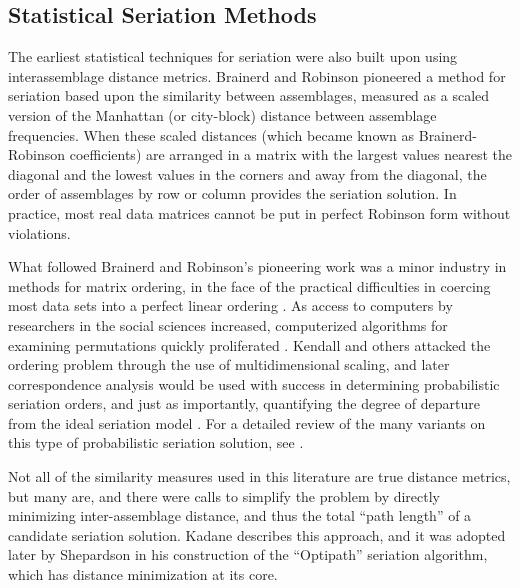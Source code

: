 \documentclass[graybox,natbib]{svmult}
\begin{document}
\subsection{Statistical Seriation
Methods}\label{statistical-seriation-methods}

The earliest statistical techniques for seriation were also built upon
using interassemblage distance metrics. Brainerd and Robinson
\citep{Brainerd1951, Robinson1951} pioneered a method for seriation
based upon the similarity between assemblages, measured as a scaled
version of the Manhattan (or city-block) distance between assemblage
frequencies. When these scaled distances (which became known as
Brainerd-Robinson coefficients) are arranged in a matrix with the
largest values nearest the diagonal and the lowest values in the corners
and away from the diagonal, the order of assemblages by row or column
provides the seriation solution. In practice, most real data matrices
cannot be put in perfect Robinson form without violations.

What followed Brainerd and Robinson's pioneering work was a minor
industry in methods for matrix ordering, in the face of the practical
difficulties in coercing most data sets into a perfect linear ordering
\citep[e.g.,][]{dempsey1963statistical, Kendall1963, Matthews1963, Bordaz1970aa, Gardin1970, Kendall1970, Kendall1971}.
As access to computers by researchers in the social sciences increased,
computerized algorithms for examining permutations quickly proliferated
\citep{Ascher1963, craytor1968refinements, Kuzara1966}. Kendall
\citeyearpar{Kendall1969} and others attacked the ordering problem
through the use of multidimensional scaling, and later correspondence
analysis would be used with success in determining probabilistic
seriation orders, and just as importantly, quantifying the degree of
departure from the ideal seriation model \citep{Smith2005}. For a
detailed review of the many variants on this type of probabilistic
seriation solution, see \citep{Marquardt:1978aa}.

Not all of the similarity measures used in this literature are true
distance metrics, but many are, and there were calls to simplify the
problem by directly minimizing inter-assemblage distance, and thus the
total ``path length'' of a candidate seriation solution. Kadane
\citeyearpar{Kadane1971} describes this approach, and it was adopted
later by Shepardson \citeyearpar{shepardson2006} in his construction of
the ``Optipath'' seriation algorithm, which has distance minimization at
its core.
\end{document}
